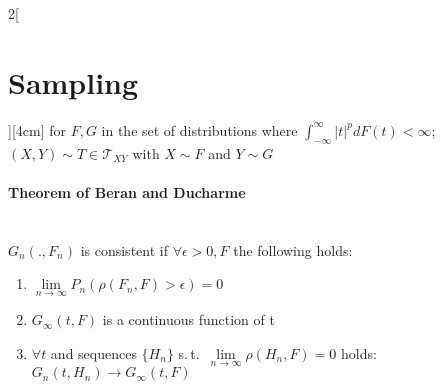 \documentclass[8pt]{extarticle}
\begin{document}
\begin{multicols}{2}[\section{Sampling}][4cm]
\noindent for $F,G$ in the set of distributions where $\int_{-\infty}^\infty |t|^pdF(t) <\infty$; $(X,Y) \sim T \in\mathcal{T}_{XY}$ with $X\sim F$ and $Y\sim G$

\paragraph{Theorem of Beran and Ducharme} \ \\

$G_n (., F_n)$ is consistent if $\forall \epsilon > 0, F$ the following holds:

\begin{enumerate}
\item $\underset{n\rightarrow\infty}{\lim}P_n(\rho(F_n,F)>\epsilon)=0$
\item $G_\infty(t,F)$ is a continuous function of t
\item $\forall t$ and sequences $\{H_n\}$ s.\,t.\ $\underset{n\rightarrow\infty}{\lim}\rho(H_n,F)=0$ holds: $G_n(t,H_n) \rightarrow G_\infty(t,F)$
\end{enumerate}


\end{multicols}
\end{document}
